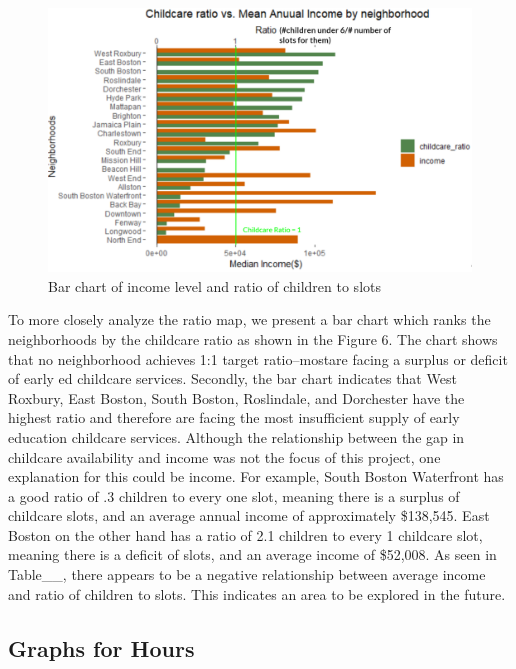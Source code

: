 \documentclass[10pt,letterpaper]{article}
\begin{document}
\begin{figure}

{\centering \includegraphics[width=1\linewidth]{income} 

}

\caption{Bar chart of income level and ratio of children to slots}\label{fig:unnamed-chunk-6}
\end{figure}

To more closely analyze the ratio map, we present a bar chart which
ranks the neighborhoods by the childcare ratio as shown in the Figure 6.
The chart shows that no neighborhood achieves 1:1 target ratio--mostare
facing a surplus or deficit of early ed childcare services. Secondly,
the bar chart indicates that West Roxbury, East Boston, South Boston,
Roslindale, and Dorchester have the highest ratio and therefore are
facing the most insufficient supply of early education childcare
services. Although the relationship between the gap in childcare
availability and income was not the focus of this project, one
explanation for this could be income. For example, South Boston
Waterfront has a good ratio of .3 children to every one slot, meaning
there is a surplus of childcare slots, and an average annual income of
approximately \$138,545. East Boston on the other hand has a ratio of
2.1 children to every 1 childcare slot, meaning there is a deficit of
slots, and an average income of \$52,008. As seen in Table\_\_, there
appears to be a negative relationship between average income and ratio
of children to slots. This indicates an area to be explored in the
future.

\subsection{Graphs for Hours}\label{graphs-for-hours}
\end{document}
